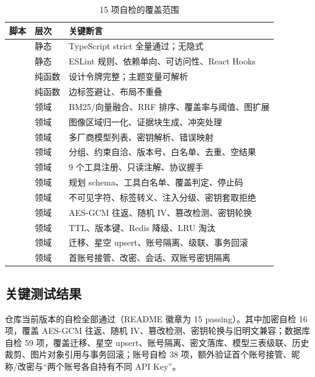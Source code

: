 \begin{table}[H]
  \centering
  \small
  \caption{15 项自检的覆盖范围}
  \label{tab:checks}
  \footnotesize
  \begin{tabularx}{\textwidth}{L{3.6cm}L{3.6cm}Y}
    \toprule
\textbf{脚本} & \textbf{层次} & \textbf{关键断言} \\
    \midrule
     & 静态 & TypeScript strict 全量通过；无隐式  \\
     & 静态 & ESLint 规则、依赖单向、可访问性、React Hooks \\
     & 纯函数 & 设计令牌完整；主题变量可解析 \\
     & 纯函数 & 边标签避让、布局不重叠 \\
     & 领域 & BM25/向量融合、RRF 排序、覆盖率与阈值、图扩展 \\
     & 领域 & 图像区域归一化、证据块生成、冲突处理 \\
     & 领域 & 多厂商模型列表、密钥解析、错误映射 \\
     & 领域 & 分组、约束自洽、版本号、白名单、去重、空结果 \\
     & 领域 & 9 个工具注册、只读注解、协议握手 \\
     & 领域 & 规划 schema、工具白名单、覆盖判定、停止码 \\
     & 领域 & 不可见字符、标签转义、注入分级、密钥套取拒绝 \\
     & 领域 & AES-GCM 往返、随机 IV、篡改检测、密钥轮换 \\
     & 领域 & TTL、版本键、Redis 降级、LRU 淘汰 \\
     & 领域 & 迁移、星空 upsert、账号隔离、级联、事务回滚 \\
     & 领域 & 首账号接管、改密、会话、双账号密钥隔离 \\
    \bottomrule
  \end{tabularx}
\end{table}

\subsection{关键测试结果}

仓库当前版本的自检全部通过（README 徽章为 15 passing）。其中加密自检 16 项，覆盖 AES-GCM 往返、随机 IV、篡改检测、密钥轮换与旧明文兼容；数据库自检 59 项，覆盖迁移、星空 upsert、账号隔离、密文落库、模型三表级联、历史裁剪、图片对象引用与事务回滚；账号自检 38 项，额外验证首个账号接管、昵称/改密与“两个账号各自持有不同 API Key”。

